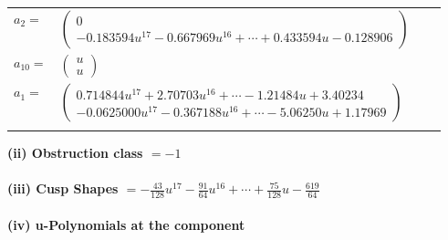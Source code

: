 \documentclass[1p]{elsarticle_modified}
\theoremstyle{definition}
\begin{document}
\begin{tabular}{m{7pt} m{180pt} m{7pt} m{180pt} }
\flushright $a_{2}=$&$\begin{pmatrix}0\\-0.183594 u^{17}-0.667969 u^{16}+\cdots+0.433594 u-0.128906\end{pmatrix}$ \\
\flushright $a_{10}=$&$\begin{pmatrix}u\\u\end{pmatrix}$ \\
\flushright $a_{1}=$&$\begin{pmatrix}0.714844 u^{17}+2.70703 u^{16}+\cdots-1.21484 u+3.40234\\-0.0625000 u^{17}-0.367188 u^{16}+\cdots-5.06250 u+1.17969\end{pmatrix}$\\&\end{tabular}
\flushleft \textbf{(ii) Obstruction class $= -1$}\\~\\
\flushleft \textbf{(iii) Cusp Shapes $= -\frac{43}{128} u^{17}-\frac{91}{64} u^{16}+\cdots+\frac{75}{128} u-\frac{619}{64}$}\\~\\
\newpage\renewcommand{\arraystretch}{1}
\flushleft \textbf{(iv) u-Polynomials at the component}\newline \\
\end{document}
